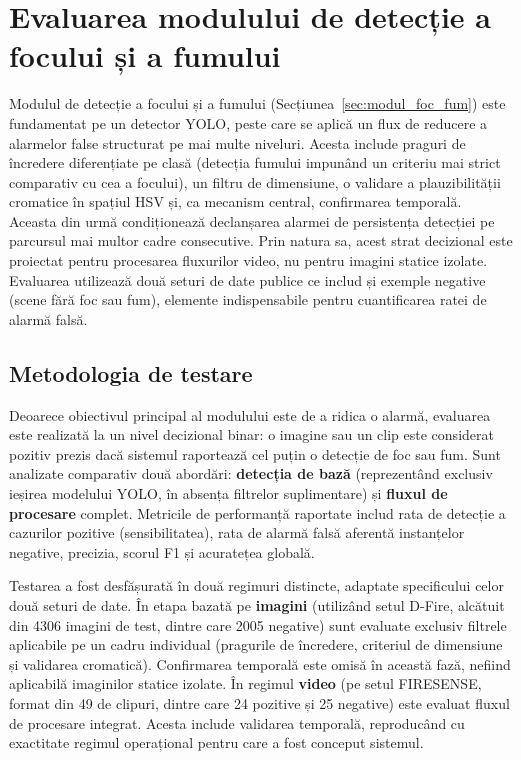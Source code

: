 \documentclass[../../main.tex]{subfiles}
\begin{document}
\section{Evaluarea modulului de detecție a focului și a fumului}
\label{sec:eval_foc}

Modulul de detecție a focului și a fumului (Secțiunea~\ref{sec:modul_foc_fum}) este fundamentat pe un detector YOLO, peste care se aplică un flux de reducere a alarmelor false structurat pe mai multe niveluri. Acesta include praguri de încredere diferențiate pe clasă (detecția fumului impunând un criteriu mai strict comparativ cu cea a focului), un filtru de dimensiune, o validare a plauzibilității cromatice în spațiul HSV și, ca mecanism central, confirmarea temporală. Aceasta din urmă condiționează declanșarea alarmei de persistența detecției pe parcursul mai multor cadre consecutive. Prin natura sa, acest strat decizional este proiectat pentru procesarea fluxurilor video, nu pentru imagini statice izolate. Evaluarea utilizează două seturi de date publice ce includ și exemple negative (scene fără foc sau fum), elemente indispensabile pentru cuantificarea ratei de alarmă falsă.

\subsection{Metodologia de testare}
\label{subsec:metodologie_foc}

Deoarece obiectivul principal al modulului este de a ridica o alarmă, evaluarea este realizată la un nivel decizional binar: o imagine sau un clip este considerat pozitiv prezis dacă sistemul raportează cel puțin o detecție de foc sau fum. Sunt analizate comparativ două abordări: \textbf{detecția de bază} (reprezentând exclusiv ieșirea modelului YOLO, în absența filtrelor suplimentare) și \textbf{fluxul de procesare} complet. Metricile de performanță raportate includ rata de detecție a cazurilor pozitive (sensibilitatea), rata de alarmă falsă aferentă instanțelor negative, precizia, scorul F1 și acuratețea globală.

Testarea a fost desfășurată în două regimuri distincte, adaptate specificului celor două seturi de date. În etapa bazată pe \textbf{imagini} (utilizând setul D-Fire, alcătuit din 4306 imagini de test, dintre care 2005 negative) sunt evaluate exclusiv filtrele aplicabile pe un cadru individual (pragurile de încredere, criteriul de dimensiune și validarea cromatică). Confirmarea temporală este omisă în această fază, nefiind aplicabilă imaginilor statice izolate. În regimul \textbf{video} (pe setul FIRESENSE, format din 49 de clipuri, dintre care 24 pozitive și 25 negative) este evaluat fluxul de procesare integrat. Acesta include validarea temporală, reproducând cu exactitate regimul operațional pentru care a fost conceput sistemul.
\end{document}
